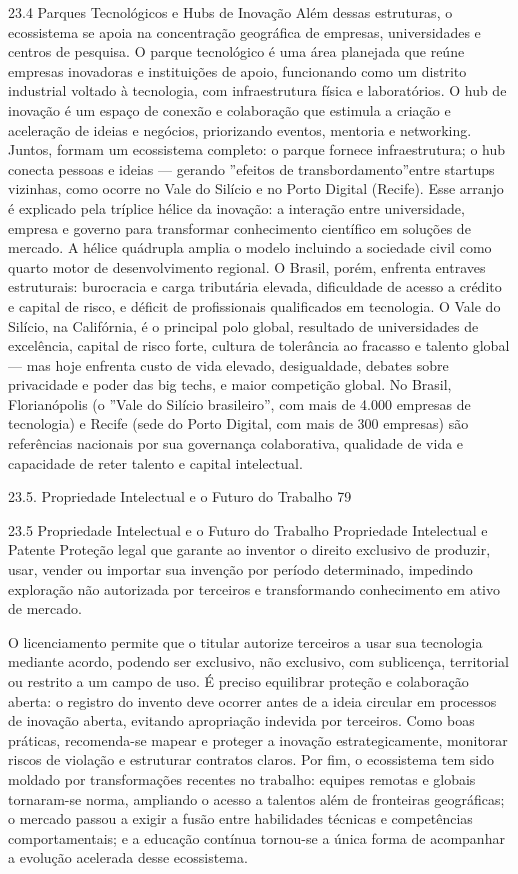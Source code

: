 23.4 Parques Tecnológicos e Hubs de Inovação Além dessas estruturas, o ecossistema se apoia na concentração geográfica de empresas, universidades e centros de pesquisa. O parque tecnológico é uma área planejada que reúne empresas inovadoras e instituições de apoio, funcionando como um distrito industrial voltado à tecnologia, com infraestrutura física e laboratórios. O hub de inovação é um espaço de conexão e colaboração que estimula a criação e aceleração de ideias e negócios, priorizando eventos, mentoria e networking. Juntos, formam um ecossistema completo: o parque fornece infraestrutura; o hub conecta pessoas e ideias — gerando ”efeitos de transbordamento”entre startups vizinhas, como ocorre no Vale do Silício e no Porto Digital (Recife). Esse arranjo é explicado pela tríplice hélice da inovação: a interação entre universidade, empresa e governo para transformar conhecimento científico em soluções de mercado. A hélice quádrupla amplia o modelo incluindo a sociedade civil como quarto motor de desenvolvimento regional. O Brasil, porém, enfrenta entraves estruturais: burocracia e carga tributária elevada, dificuldade de acesso a crédito e capital de risco, e déficit de profissionais qualificados em tecnologia. O Vale do Silício, na Califórnia, é o principal polo global, resultado de universidades de excelência, capital de risco forte, cultura de tolerância ao fracasso e talento global — mas hoje enfrenta custo de vida elevado, desigualdade, debates sobre privacidade e poder das big techs, e maior competição global. No Brasil, Florianópolis (o ”Vale do Silício brasileiro”, com mais de 4.000 empresas de tecnologia) e Recife (sede do Porto Digital, com mais de 300 empresas) são referências nacionais por sua governança colaborativa, qualidade de vida e capacidade de reter talento e capital intelectual.

23.5. Propriedade Intelectual e o Futuro do Trabalho 79

23.5 Propriedade Intelectual e o Futuro do Trabalho Propriedade Intelectual e Patente Proteção legal que garante ao inventor o direito exclusivo de produzir, usar, vender ou importar sua invenção por período determinado, impedindo exploração não autorizada por terceiros e transformando conhecimento em ativo de mercado.

O licenciamento permite que o titular autorize terceiros a usar sua tecnologia mediante acordo, podendo ser exclusivo, não exclusivo, com sublicença, territorial ou restrito a um campo de uso. É preciso equilibrar proteção e colaboração aberta: o registro do invento deve ocorrer antes de a ideia circular em processos de inovação aberta, evitando apropriação indevida por terceiros. Como boas práticas, recomenda-se mapear e proteger a inovação estrategicamente, monitorar riscos de violação e estruturar contratos claros. Por fim, o ecossistema tem sido moldado por transformações recentes no trabalho: equipes remotas e globais tornaram-se norma, ampliando o acesso a talentos além de fronteiras geográficas; o mercado passou a exigir a fusão entre habilidades técnicas e competências comportamentais; e a educação contínua tornou-se a única forma de acompanhar a evolução acelerada desse ecossistema.


